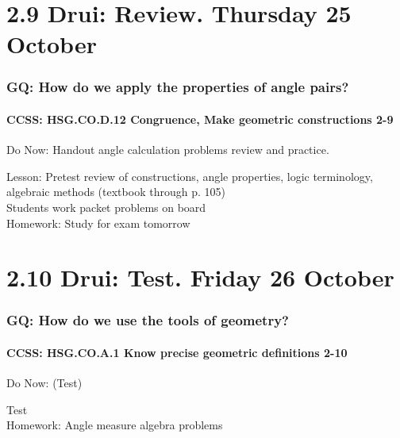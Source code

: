 \documentclass{beamer}
\begin{document}
\section{2.9 Drui: Review. Thursday 25 October}
  \frame
  {
  \frametitle{GQ: How do we apply the properties of angle pairs?}
  \framesubtitle{CCSS: HSG.CO.D.12 Congruence, Make geometric constructions  \alert{2-9}}

  \begin{block}{Do Now: Handout angle calculation problems review and practice.}
  \end{block}
  Lesson: Pretest review of constructions, angle properties, logic terminology, algebraic methods (textbook through p. 105)\\
  Students work packet problems on board\\
  \vspace{0.5cm}
  Homework: Study for \alert{exam tomorrow}
}

\section{2.10 Drui: Test. Friday 26 October}
        \frame
        {
          \frametitle{GQ: How do we use the tools of geometry?}
          \framesubtitle{CCSS: HSG.CO.A.1 Know precise geometric definitions  \alert{2-10}}

          \begin{block}{Do Now: (Test)}
          \end{block}
          Test\\
          \vspace{1cm}
          Homework: Angle measure algebra problems
        }
\end{document}
